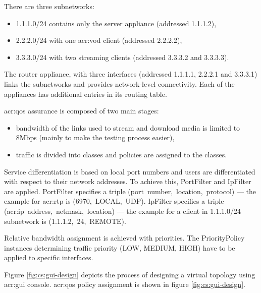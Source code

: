 \documentclass[11pt,openany]{book}
\begin{document}
        There are three subnetworks:

        \begin{itemize}
          \item 1.1.1.0/24 contains only the server appliance (addressed 1.1.1.2),
          \item 2.2.2.0/24 with one \gls{acr:vod} client (addressed 2.2.2.2),
          \item 3.3.3.0/24 with two streaming clients (addressed 3.3.3.2 and 3.3.3.3).
        \end{itemize}

        The router appliance, with three interfaces (addressed 1.1.1.1, 2.2.2.1 and 3.3.3.1) links the subnetworks and
        provides network-level connectivity. Each of the appliances has additional entries in its routing table.

        \gls{acr:qos} assurance is composed of two main stages:

        \begin{itemize}
          \item bandwidth of the links used to stream and download media is limited to 8Mbps (mainly to make the
                testing process easier),
          \item traffic is divided into classes and policies are assigned to the classes.
        \end{itemize}

        Service differentiation is based on local port numbers and users are differentiated with respect to their
        network addresses. To achieve this, PortFilter and IpFilter are applied. PortFilter specifies a triple
        \mbox{(port number, location, protocol)} --- the example for \gls{acr:rtp} is \mbox{(6970, LOCAL, UDP)}.
        IpFilter specifies a triple \mbox{(\gls{acr:ip} address, netmask, location)} --- the example for a client in
        1.1.1.0/24 subnetwork is \mbox{(1.1.1.2, 24, REMOTE)}.

        Relative bandwidth assignment is achieved with priorities. The PriorityPolicy instances determining traffic
        priority (LOW, MEDIUM, HIGH) have to be applied to specific interfaces.

        Figure \ref{fig:cs:gui-design} depicts the process of designing a virtual topology using \gls{acr:gui} console.
        \gls{acr:qos} policy assignment is shown in figure \ref{fig:cs:gui-design}.
\end{document}
